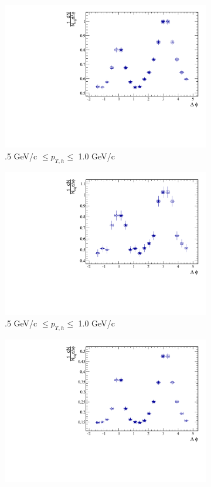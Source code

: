 \begin{figure}[htbp]
	\begin{subfigure}{0.5\textwidth}
		\includegraphics[width=.9\textwidth]{Plots/Correlations/pp/pp_NPE_h_corr_primpt_4_5_assopt_1_1.pdf}
		\caption{.5 GeV/c $\leq p_{T,h} \leq$ 1.0 GeV/c}
		\label{fig:ppcorra}
	\end{subfigure}	
	\begin{subfigure}{0.5\textwidth}
		\includegraphics[width=.9\textwidth]{Plots/Correlations/pp/pp_NPE_h_corr_primpt_6_8_assopt_1_1.pdf}
		\caption{.5 GeV/c $\leq p_{T,h} \leq$ 1.0 GeV/c}
		\label{fig:ppcorrb}
	\end{subfigure}	
	\begin{subfigure}{0.5\textwidth}
		\includegraphics[width=.9\textwidth]{Plots/Correlations/pp/pp_NPE_h_corr_primpt_4_5_assopt_2_2.pdf}

\end{subfigure}
\end{figure}
